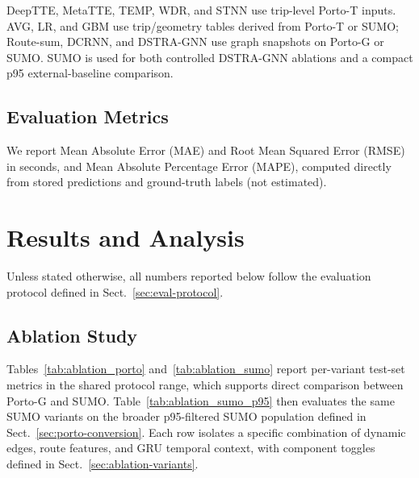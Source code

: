 \documentclass[pdflatex,sn-basic,Numbered]{sn-jnl}%
\begin{document}
DeepTTE, MetaTTE, TEMP, WDR, and STNN use trip-level Porto-T inputs. AVG, LR, and GBM use trip/geometry tables derived from Porto-T or SUMO; Route-sum, DCRNN, and DSTRA-GNN use graph snapshots on Porto-G or SUMO. SUMO is used for both controlled DSTRA-GNN ablations and a compact p95 external-baseline comparison.

\subsection{Evaluation Metrics}
We report Mean Absolute Error (MAE) and Root Mean Squared Error (RMSE) in seconds, and Mean Absolute Percentage Error (MAPE), computed directly from stored predictions and ground-truth labels (not estimated).




\section{Results and Analysis}\label{sec5}

Unless stated otherwise, all numbers reported below follow the evaluation protocol defined in Sect.~\ref{sec:eval-protocol}.

\subsection{Ablation Study}\label{sec5:ablation}

Tables~\ref{tab:ablation_porto} and~\ref{tab:ablation_sumo} report per-variant test-set metrics in the shared protocol range, which supports direct comparison between Porto-G and SUMO. Table~\ref{tab:ablation_sumo_p95} then evaluates the same SUMO variants on the broader p95-filtered SUMO population defined in Sect.~\ref{sec:porto-conversion}. Each row isolates a specific combination of dynamic edges, route features, and GRU temporal context, with component toggles defined in Sect.~\ref{sec:ablation-variants}.
\end{document}

